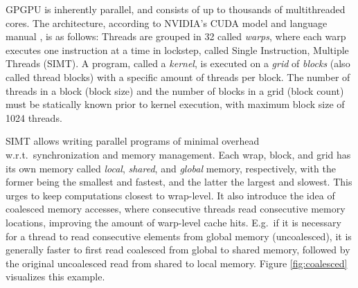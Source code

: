 GPGPU is inherently parallel, and consists of up to thousands of multithreaded
cores. The architecture, according to NVIDIA's CUDA model and language manual
\cite{cudaguide}, is as follows: Threads are grouped in 32 called
\textit{warps}, where each warp executes one instruction at a time in lockstep,
called Single Instruction, Multiple Threads (SIMT). A program, called a
\textit{kernel}, is executed on a \textit{grid} of \textit{blocks} (also
called thread blocks) with a specific amount of threads per block. The number of
threads in a block (block size) and the number of blocks in a grid (block count)
must be statically known prior to kernel execution, with maximum block size of
1024 threads.

SIMT allows writing parallel programs of minimal overhead w.r.t.\ synchronization
and memory management. Each wrap, block, and grid has its own memory called
\textit{local}, \textit{shared}, and \textit{global} memory, respectively, with
the former being the smallest and fastest, and the latter the largest and
slowest. This urges to keep computations closest to wrap-level. It also
introduce the idea of coalesced memory accesses, where consecutive threads read
consecutive memory locations, improving the amount of warp-level cache
hits. E.g.\ if it is necessary for a thread to read consecutive elements from
global memory (uncoalesced), it is generally faster to first read coalesced from
global to shared memory, followed by the original uncoalesced read from shared to
local memory. Figure \ref{fig:coalesced} visualizes this example.

